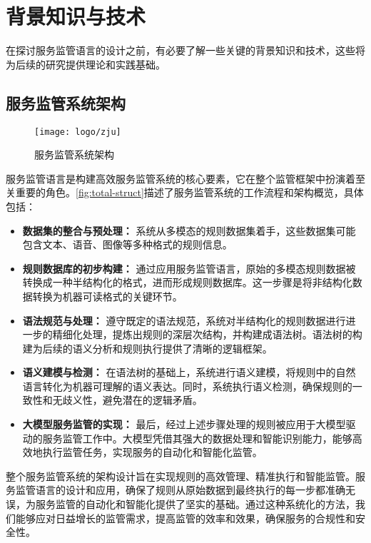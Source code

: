 \cleardoublepage

\section{背景知识与技术}

在探讨服务监管语言的设计之前，有必要了解一些关键的背景知识和技术，这些将为后续的研究提供理论和实践基础。

\subsection{服务监管系统架构}

\begin{figure}[ht]
    \centering
    \texttt{[image: logo/zju]}
    \caption{\label{fig:total-struct}服务监管系统架构}
\end{figure}

服务监管语言是构建高效服务监管系统的核心要素，它在整个监管框架中扮演着至关重要的角色。\autoref{fig:total-struct}描述了服务监管系统的工作流程和架构概览，具体包括：

\begin{itemize}
    \item \textbf{数据集的整合与预处理：} 系统从多模态的规则数据集着手，这些数据集可能包含文本、语音、图像等多种格式的规则信息。
    \item \textbf{规则数据库的初步构建：} 通过应用服务监管语言，原始的多模态规则数据被转换成一种半结构化的格式，进而形成规则数据库。这一步骤是将非结构化数据转换为机器可读格式的关键环节。
    \item \textbf{语法规范与处理：} 遵守既定的语法规范，系统对半结构化的规则数据进行进一步的精细化处理，提炼出规则的深层次结构，并构建成语法树。语法树的构建为后续的语义分析和规则执行提供了清晰的逻辑框架。
    \item \textbf{语义建模与检测：} 在语法树的基础上，系统进行语义建模，将规则中的自然语言转化为机器可理解的语义表达。同时，系统执行语义检测，确保规则的一致性和无歧义性，避免潜在的逻辑矛盾。
    \item \textbf{大模型服务监管的实现：} 最后，经过上述步骤处理的规则被应用于大模型驱动的服务监管工作中。大模型凭借其强大的数据处理和智能识别能力，能够高效地执行监管任务，实现服务的自动化和智能化监管。
\end{itemize}

整个服务监管系统的架构设计旨在实现规则的高效管理、精准执行和智能监管。服务监管语言的设计和应用，确保了规则从原始数据到最终执行的每一步都准确无误，为服务监管的自动化和智能化提供了坚实的基础。通过这种系统化的方法，我们能够应对日益增长的监管需求，提高监管的效率和效果，确保服务的合规性和安全性。

